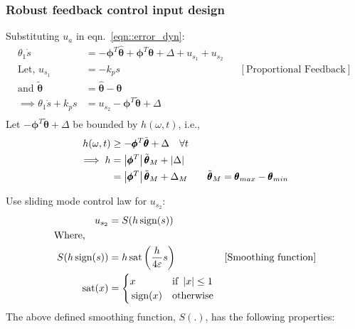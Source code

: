 \subsubsection{Robust feedback control input design}
Substituting $u_a$ in eqn.~\ref{eqn::error_dyn}:
\begin{align*}
    \theta_1 \dot s &= -\pmb \phi^T \hat{\pmb \theta} + \pmb \phi^T \pmb \theta + \Delta + u_{s_1} + u_{s_2}\\
    \text{Let,  } u_{s_1} &= -k_p s & & [\text{Proportional Feedback}]\\
    \text{and  } \tilde{\pmb\theta} &= \hat{\pmb \theta} - \pmb \theta\\
    \implies \theta_1 \dot s + k_p s &= u_{s_2} - \pmb \phi^T \tilde{\pmb \theta} + \Delta\\
\end{align*}
Let $- \pmb \phi^T \tilde{\pmb \theta} + \Delta$ be bounded by $h(\omega, t)$,
i.e.,
\begin{align*}
    h(\omega, t) &\geq   - \pmb \phi^T \tilde{\pmb \theta} + \Delta  \quad \forall t\\
    \implies h &= \left\lvert \pmb \phi^T \right\rvert \tilde{\pmb \theta}_M + \left\lvert \Delta \right\rvert\\
               &= \left\lvert \pmb \phi^T \right\rvert \tilde{\pmb \theta}_M + \Delta_M \qquad
                \tilde{\pmb \theta}_M = \pmb \theta_{max} - \pmb \theta_{min}\\
\end{align*}

Use sliding mode control law for $u_{s_2}$:
\begin{align*}
    u_{s_2} &= S(h \,\text{sign}(s))\\
    \text{Where,  } \qquad &\\
    S(h \,\text{sign}(s)) &= h \,\text{sat} \left(  \frac{h}{4 \varepsilon} s \right) &[\text{Smoothing function}]\\
    \,\text{sat} (x) &= \begin{cases}
        x  & \text{if  } \left\lvert x \right\rvert \leq   1\\
        \,\text{sign}(x) &  \text{otherwise}
    \end{cases}
\end{align*}
The above defined smoothing function, $S(.)$, has the following properties:

